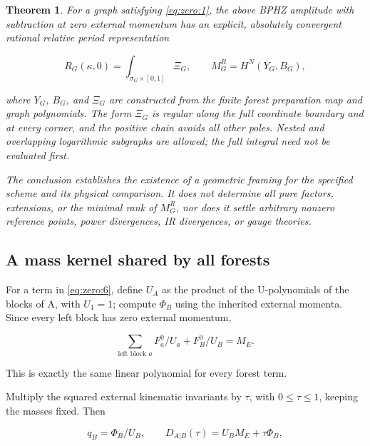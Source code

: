 \documentclass[11pt,a4paper,oneside]{article}
\theoremstyle{plain}
\newtheorem{theorem}{Theorem}[section]
\theoremstyle{definition}
\theoremstyle{remark}
\numberwithin{equation}{section}
\begin{document}
\begin{theorem}

\label{thm:zero:1} For a graph satisfying \eqref{eq:zero:1}, the above BPHZ amplitude with subtraction at zero external momentum has an explicit, absolutely convergent rational relative period representation

\begin{equation}
R_G(\kappa,0)=\int_{\widetilde\sigma_G\times[0,1]}\Xi_G,
 \qquad M_G^R=H^N(Y_G,B_G),                                  \label{eq:zero:2}
\end{equation}

where \(Y_G\), \(B_G\), and \(\Xi _G\) are constructed from the finite forest preparation map and graph polynomials. The form \(\Xi _G\) is regular along the full coordinate boundary and at every corner, and the positive chain avoids all other poles. Nested and overlapping logarithmic subgraphs are allowed; the full integral need not be evaluated first.

The conclusion establishes the existence of a geometric framing for the specified scheme and its physical comparison. It does not determine all pure factors, extensions, or the minimal rank of \(M_G^R\), nor does it settle arbitrary nonzero reference points, power divergences, IR divergences, or gauge theories.

\end{theorem}


\subsection{A mass kernel shared by all forests}\label{sec:zero:4}

For a term in \eqref{eq:zero:6}, define \(U_A\) as the product of the U-polynomials of the blocks of A, with \(U_1=1\); compute \(\Phi _B\) using the inherited external momenta. Since every left block has zero external momentum,

\begin{equation}
\sum_{\text{left block }a}F_a^0/U_a+F_B^0/U_B=M_E.                 \label{eq:zero:8}
\end{equation}

This is exactly the same linear polynomial for every forest term.

Multiply the squared external kinematic invariants by \(\tau \), with \(0\le \tau \le 1\), keeping the masses fixed. Then

\begin{equation}
q_B=\Phi_B/U_B,\qquad
 D_{A|B}(\tau)=U_BM_E+\tau\Phi_B,
\end{equation}
\end{document}
